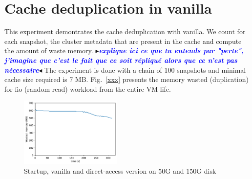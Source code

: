 \documentclass[sigplan,screen,10pt]{acmart}
\newcommand{\mynote}[2]{\fbox{\bfseries\sffamily\footnotesize{\textbf{#1}}}
 {\small$\blacktriangleright$\textsf{\emph{#2}}$\blacktriangleleft$}}
\newcommand{\mynote}[2]{}
\newcommand{\stella}[1]{\mynote{\textcolor{red}{Stella}}{\textcolor{blue}{\textbf{#1}}}}
\begin{document}
	\section*{Cache deduplication in vanilla}
	This experiment demontrates the cache deduplication with vanilla.
	We count for each snapshot, the cluster metadata that are present in the cache and compute the amount of waste memory. \stella{explique ici ce que tu entends par "perte", j'imagine que c'est le fait que ce soit répliqué alors que ce n'est pas nécessaire}
	The experiment is done with a chain of 100 snapshots and minimal cache size required is 7 MB.
	Fig.~\ref{xxx} presents the memory wasted (duplication) for fio (random read) workload from the entire VM life.
	
	\begin{figure}[h]
		\center
		\includegraphics[width=0.45\textwidth]{dupli_memory.pdf}
		\caption{Startup, vanilla and direct-access version on 50G and 150G disk}
		\label{fig:fig-d}
	\end{figure}
\end{document}
